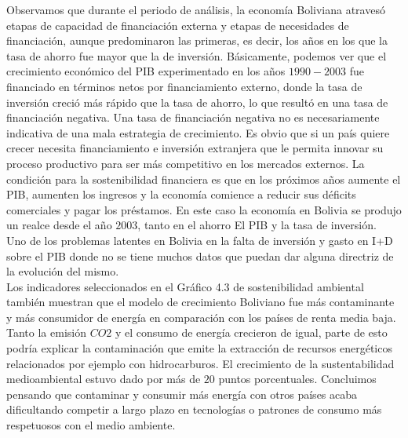     Observamos que durante el periodo de análisis, la economía Boliviana atravesó etapas de capacidad de financiación externa y etapas de necesidades de financiación, aunque predominaron las primeras, es decir, los años en los que la tasa de ahorro fue mayor que la de inversión. Básicamente, podemos ver que el crecimiento económico del PIB experimentado en los años $1990-2003$ fue financiado en términos netos por financiamiento externo, donde la tasa de inversión creció más rápido que la tasa de ahorro, lo que resultó en una tasa de financiación negativa. Una tasa de financiación negativa no es necesariamente indicativa de una mala estrategia de crecimiento. Es obvio que si un país quiere crecer necesita financiamiento e inversión extranjera que le permita innovar su proceso productivo para ser más competitivo en los mercados externos. La condición para la sostenibilidad financiera es que en los próximos años aumente el PIB, aumenten los ingresos y la economía comience a reducir sus déficits comerciales y pagar los préstamos. En este caso la economía en Bolivia se produjo un realce desde el año $2003$, tanto en el ahorro El PIB y la tasa de inversión. \\
    Uno de los problemas latentes en Bolivia en la falta de inversión y gasto en I+D sobre el PIB donde no se tiene muchos datos que puedan dar alguna directriz de la evolución del mismo.\\
    Los indicadores seleccionados en el Gráfico 4.3 de sostenibilidad ambiental también muestran que el modelo de crecimiento Boliviano fue más contaminante y más consumidor de energía en comparación con los países de renta media baja. Tanto la emisión $CO2$ y el consumo de energía crecieron de igual, parte de esto podría explicar la contaminación que emite la extracción de recursos energéticos relacionados por ejemplo con hidrocarburos. El crecimiento de la sustentabilidad medioambiental estuvo dado por más de $20$ puntos porcentuales. Concluimos pensando que contaminar y consumir más energía con otros países acaba dificultando competir a largo plazo en tecnologías o patrones de consumo más respetuosos con el medio ambiente.

